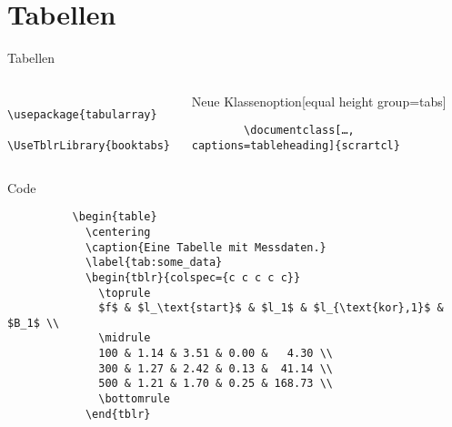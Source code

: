 \section{Tabellen}

\begin{frame}[fragile]{
  Tabellen
  \hfill
}
  \begin{columns}[t, onlytextwidth]
    \begin{column}{0.33\textwidth}
      \begin{Packages}[equal height group=tabs]
        \begin{verbatim}
          \usepackage{tabularray}
          \UseTblrLibrary{booktabs}
        \end{verbatim}
      \end{Packages}
    \end{column}
    \begin{column}{0.66\textwidth}
    \begin{block}{Neue Klassenoption}[equal height group=tabs]
      \begin{verbatim}
        \documentclass[…, captions=tableheading]{scrartcl}
      \end{verbatim}
    \end{block}
    \end{column}
  \end{columns}
  \vspace{-2pt}
  \begin{columns}[onlytextwidth, t]
    \begin{column}{0.60\textwidth}
      \fontsize{8}{6}
      \begin{block}{Code}
        \begin{verbatim}
          \begin{table}
            \centering
            \caption{Eine Tabelle mit Messdaten.}
            \label{tab:some_data}
            \begin{tblr}{colspec={c c c c c}}
              \toprule
              $f$ & $l_\text{start}$ & $l_1$ & $l_{\text{kor},1}$ & $B_1$ \\
              \midrule
              100 & 1.14 & 3.51 & 0.00 &   4.30 \\
              300 & 1.27 & 2.42 & 0.13 &  41.14 \\
              500 & 1.21 & 1.70 & 0.25 & 168.73 \\
              \bottomrule
            \end{tblr}

\end{verbatim}
\end{block}
\end{column}
\end{columns}
\end{frame}
